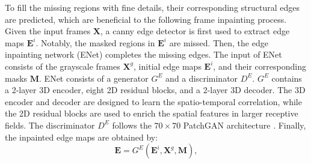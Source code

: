 To fill the missing regions with fine details, their corresponding structural edges are predicted, which are beneficial to the following frame inpainting process.
%
Given the input frames $\boldsymbol{X}$, a canny edge detector is first used to extract edge maps $\boldsymbol{E}^{i}$. Notably, the masked regions in $\boldsymbol{E}^{i}$ are missed. 
Then, the edge inpainting network (ENet) completes the missing edges.
The input of ENet consists of the grayscale frames $\boldsymbol{X}^{g}$, initial edge maps $\boldsymbol{E}^{i}$, and their corresponding masks $\boldsymbol{M}$.
%
 ENet consists of a generator $G^E$ and a discriminator $D^E$.
$G^E$ contains a 2-layer 3D encoder, eight 2D residual blocks, and a 2-layer 3D decoder. 
The 3D encoder and decoder are designed to learn the spatio-temporal correlation, while the 2D residual blocks are used to enrich the spatial features in larger receptive fields. The discriminator $D^E$ follows the $70\times 70$ PatchGAN architecture \cite{Isola_2017_CVPR}. 
Finally, the inpainted edge maps are obtained by:
\begin{equation}
\label{eq:edgenet}
\boldsymbol{E}=G^E(\boldsymbol{E}^{i},\boldsymbol{X}^{g},\boldsymbol{M}),
\end{equation}

